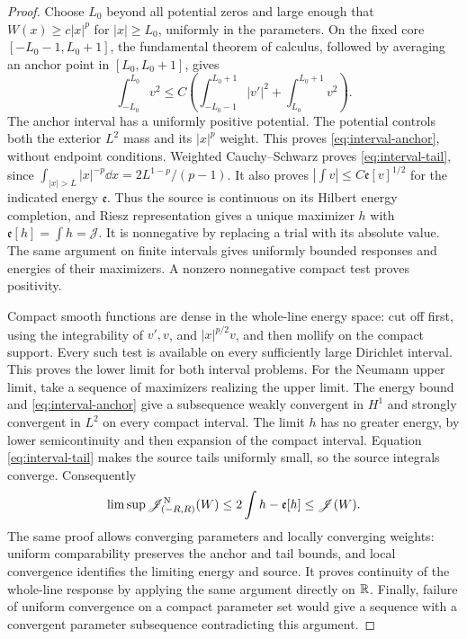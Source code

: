 \begin{proof}
Choose $L_0$ beyond all potential zeros and large enough that
$W(x)\ge c|x|^p$ for $|x|\ge L_0$, uniformly in the parameters.
On the fixed core $[-L_0-1,L_0+1]$, the fundamental theorem of calculus,
followed by averaging an anchor point in $[L_0,L_0+1]$, gives
\[
 \int_{-L_0}^{L_0}v^2\le C\left(\int_{-L_0-1}^{L_0+1}|v'|^2
                                  +\int_{L_0}^{L_0+1}v^2\right).
\]
The anchor interval has a uniformly positive potential. The potential
controls both the exterior $L^2$ mass and its $|x|^p$ weight. This proves
\eqref{eq:interval-anchor}, without endpoint conditions. Weighted
Cauchy--Schwarz proves \eqref{eq:interval-tail}, since
$\int_{|x|>L}|x|^{-p}\dd x=2L^{1-p}/(p-1)$. It also proves
$|\int v|\le C\mathfrak e[v]^{1/2}$ for the indicated energy
$\mathfrak e$. Thus the source is continuous on its Hilbert energy
completion, and Riesz representation gives a unique maximizer $h$ with
$\mathfrak e[h]=\int h=\mathscr J$. It is nonnegative by replacing a
trial with its absolute value. The same argument on finite intervals
gives uniformly bounded responses and energies of their maximizers.
A nonzero nonnegative compact test proves positivity.

Compact smooth functions are dense in the whole-line energy space:
cut off first, using the integrability of $v',v$, and $|x|^{p/2}v$,
and then mollify on the compact support. Every such test is available
on every sufficiently large Dirichlet interval. This proves the lower
limit for both interval problems. For the Neumann upper limit, take a
sequence of maximizers realizing the upper limit. The energy bound and
\eqref{eq:interval-anchor} give a subsequence weakly convergent in
$H^1$ and strongly convergent in $L^2$ on every compact interval.
The limit $h$ has no greater energy, by lower semicontinuity and then
expansion of the compact interval. Equation \eqref{eq:interval-tail}
makes the source tails uniformly small, so the source integrals converge.
Consequently
\[
 \limsup\mathscr J_{(-R,R)}^{\rm N}(W)
 \le2\int h-\mathfrak e[h]\le\mathscr J(W).
\]
The same proof allows converging parameters and locally converging
weights: uniform comparability preserves the anchor and tail bounds,
and local convergence identifies the limiting energy and source.
It proves continuity of the whole-line response by applying the same
argument directly on $\mathbb R$. Finally, failure of uniform convergence on
a compact parameter set would give a sequence with a convergent
parameter subsequence contradicting this argument.
\end{proof}

